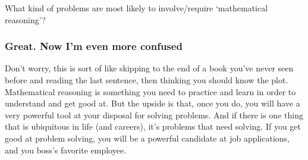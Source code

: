 \documentclass{ximeraXloud}
\begin{document}
\begin{exploration}
        What kind of problems are most likely to involve/require `mathematical reasoning'?
        \begin{multipleChoice}
        \end{multipleChoice}
    \end{exploration}

\subsubsection*{Great. Now I'm even more confused}
    Don't worry, this is sort of like skipping to the end of a book you've never seen before and reading the last sentence, then thinking you should know the plot. Mathematical reasoning is something you need to practice and learn in order to understand and get good at. But the upside is that, once you do, you will have a very powerful tool at your disposal for solving problems. And if there is one thing that is ubiquitous in life (and careers), it's problems that need solving. If you get good at problem solving, you will be a powerful candidate at job applications, and you boss's favorite employee.
\end{document}

